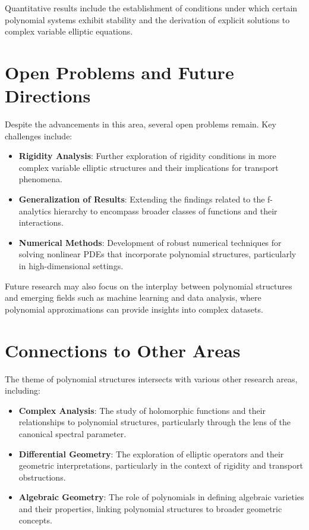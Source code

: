 \documentclass[11pt,a4paper]{article}
\begin{document}
Quantitative results include the establishment of conditions under which certain polynomial systems exhibit stability and the derivation of explicit solutions to complex variable elliptic equations.

\section{Open Problems and Future Directions}

Despite the advancements in this area, several open problems remain. Key challenges include:

\begin{itemize}
\item \textbf{Rigidity Analysis}: Further exploration of rigidity conditions in more complex variable elliptic structures and their implications for transport phenomena.
\item \textbf{Generalization of Results}: Extending the findings related to the f-analytics hierarchy to encompass broader classes of functions and their interactions.
\item \textbf{Numerical Methods}: Development of robust numerical techniques for solving nonlinear PDEs that incorporate polynomial structures, particularly in high-dimensional settings.
\end{itemize}

Future research may also focus on the interplay between polynomial structures and emerging fields such as machine learning and data analysis, where polynomial approximations can provide insights into complex datasets.

\section{Connections to Other Areas}

The theme of polynomial structures intersects with various other research areas, including:

\begin{itemize}
\item \textbf{Complex Analysis}: The study of holomorphic functions and their relationships to polynomial structures, particularly through the lens of the canonical spectral parameter.
\item \textbf{Differential Geometry}: The exploration of elliptic operators and their geometric interpretations, particularly in the context of rigidity and transport obstructions.
\item \textbf{Algebraic Geometry}: The role of polynomials in defining algebraic varieties and their properties, linking polynomial structures to broader geometric concepts.
\end{itemize}
\end{document}
